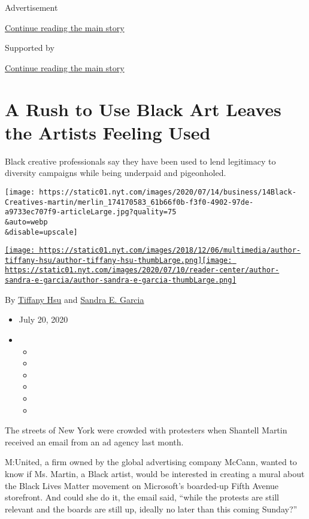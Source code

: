 Advertisement

\protect\hyperlink{after-top}{Continue reading the main story}

Supported by

\protect\hyperlink{after-sponsor}{Continue reading the main story}

\hypertarget{a-rush-to-use-black-art-leaves-the-artists-feeling-used}{%
\section{A Rush to Use Black Art Leaves the Artists Feeling
Used}\label{a-rush-to-use-black-art-leaves-the-artists-feeling-used}}

Black creative professionals say they have been used to lend legitimacy
to diversity campaigns while being underpaid and pigeonholed.

\texttt{[image: https://static01.nyt.com/images/2020/07/14/business/14Black-Creatives-martin/merlin\_174170583\_61b66f0b-f3f0-4902-97de-a9733ec707f9-articleLarge.jpg?quality=75\\\&auto=webp\\\&disable=upscale]}

\href{https://www.nytimes.com/by/tiffany-hsu}{\texttt{[image: https://static01.nyt.com/images/2018/12/06/multimedia/author-tiffany-hsu/author-tiffany-hsu-thumbLarge.png]}}\href{https://www.nytimes.com/by/sandra-e-garcia}{\texttt{[image: https://static01.nyt.com/images/2020/07/10/reader-center/author-sandra-e-garcia/author-sandra-e-garcia-thumbLarge.png]}}

By \href{https://www.nytimes.com/by/tiffany-hsu}{Tiffany Hsu} and
\href{https://www.nytimes.com/by/sandra-e-garcia}{Sandra E. Garcia}

\begin{itemize}
\item
  July 20, 2020
\item
  \begin{itemize}
  \item
  \item
  \item
  \item
  \item
  \item
  \end{itemize}
\end{itemize}

The streets of New York were crowded with protesters when Shantell
Martin received an email from an ad agency last month.

M:United, a firm owned by the global advertising company McCann, wanted
to know if Ms. Martin, a Black artist, would be interested in creating a
mural about the Black Lives Matter movement on Microsoft's boarded-up
Fifth Avenue storefront. And could she do it, the email said, ``while
the protests are still relevant and the boards are still up, ideally no
later than this coming Sunday?''

